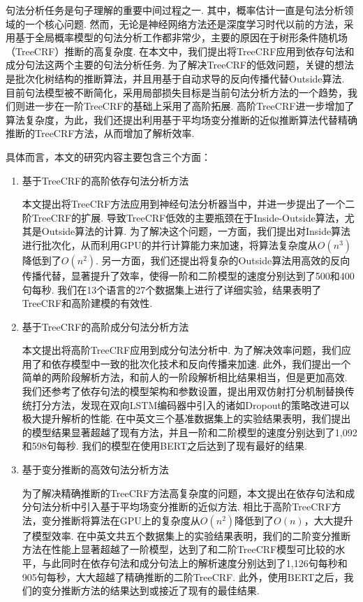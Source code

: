 
\begin{cabstract}
	句法分析任务是句子理解的重要中间过程之一.
	其中，概率估计一直是句法分析领域的一个核心问题.
	然而，无论是神经网络方法还是深度学习时代以前的方法，采用基于全局概率模型的句法分析工作都非常少，主要的原因在于树形条件随机场（TreeCRF）推断的高复杂度.
	在本文中，我们提出将TreeCRF应用到依存句法和成分句法这两个主要的句法分析任务.
	为了解决TreeCRF的低效问题，关键的想法是批次化树结构的推断算法，并且用基于自动求导的反向传播代替Outside算法.
	目前句法模型被不断简化，采用局部损失目标是当前句法分析方法的一个趋势，我们则进一步在一阶TreeCRF的基础上采用了高阶拓展.
	高阶TreeCRF进一步增加了算法复杂度，为此，我们还提出利用基于平均场变分推断的近似推断算法代替精确推断的TreeCRF方法，从而增加了解析效率.

	具体而言，本文的研究内容主要包含三个方面：
	\begin{enumerate}

		\item 基于TreeCRF的高阶依存句法分析方法

		      本文提出将TreeCRF方法应用到神经句法分析器当中，并进一步提出了一个二阶TreeCRF的扩展.
		      导致TreeCRF低效的主要瓶颈在于Inside-Outside算法，尤其是Outside算法的计算.
		      为了解决这个问题，一方面，我们提出对Inside算法进行批次化，从而利用GPU的并行计算能力来加速，将算法复杂度从$O(n^3)$降低到了$O(n^2)$.
		      另一方面，我们还提出将复杂的Outside算法用高效的反向传播代替，显著提升了效率，使得一阶和二阶模型的速度分别达到了500和400句每秒.
		      我们在13个语言的27个数据集上进行了详细实验，结果表明了TreeCRF和高阶建模的有效性.

		\item 基于TreeCRF的高阶成分句法分析方法

		      本文提出将高阶TreeCRF应用到成分句法分析中.
		      为了解决效率问题，我们应用了和依存模型中一致的批次化技术和反向传播来加速.
		      此外，我们提出一个简单的两阶段解析方法，和前人的一阶段解析相比结果相当，但是更加高效.
		      我们还参考了依存句法的模型架构和参数设置，提出用双仿射打分机制替换传统打分方法，发现在双向LSTM编码器中引入的诸如Dropout的策略改进可以极大提升解析的性能.
		      在中英文三个基准数据集上的实验结果表明，我们提出的模型结果显著超越了现有方法，并且一阶和二阶模型的速度分别达到了1,092和598句每秒.
		      我们的模型在使用BERT之后达到了现有最好的结果.

		\item 基于变分推断的高效句法分析方法

		      为了解决精确推断的TreeCRF方法高复杂度的问题，本文提出在依存句法和成分句法分析中引入基于平均场变分推断的近似方法.
		      相比于高阶TreeCRF方法，变分推断将算法在GPU上的复杂度从$O(n^2)$降低到了$O(n)$，大大提升了模型效率.
		      在中英文共五个数据集上的实验结果表明，我们的二阶变分推断方法在性能上显著超越了一阶模型，达到了和二阶TreeCRF模型可比较的水平，与此同时在依存句法和成分句法上的解析速度分别达到了1,126句每秒和905句每秒，大大超越了精确推断的二阶TreeCRF.
		      此外，使用BERT之后，我们的变分推断方法的结果达到或接近了现有的最佳结果.


\end{enumerate}
\end{cabstract}
